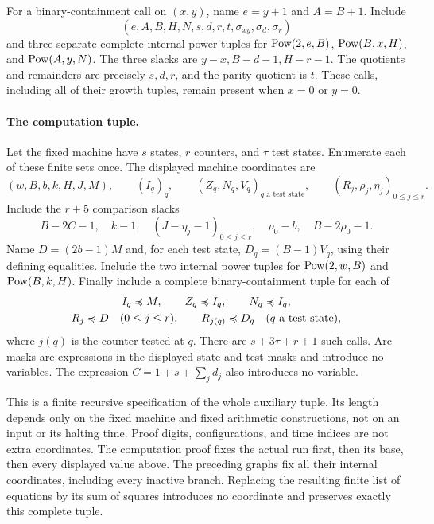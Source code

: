 For a binary-containment call on \((x,y)\), name \(e=y+1\) and
\(A=B+1\). Include
\[
 (e,A,B,H,N,s,d,r,t,\sigma_{xy},\sigma_d,\sigma_r)
\]
and three separate complete internal power tuples for
\(\operatorname{Pow}(2,e,B)\), \(\operatorname{Pow}(B,x,H)\), and \(\operatorname{Pow}(A,y,N)\).
The three slacks are \(y-x,B-d-1,H-r-1\). The quotients and remainders
are precisely \(s,d,r\), and the parity quotient is \(t\).
These calls, including all of their growth tuples, remain present when
\(x=0\) or \(y=0\).

\paragraph{The computation tuple.}
Let the fixed machine have \(s\) states, \(r\) counters, and
\(\tau\) test states. Enumerate each of these finite sets once.
The displayed machine coordinates are
\[
 (w,B,b,k,H,J,M),\qquad
 (I_q)_q,\qquad (Z_q,N_q,V_q)_{q\text{ a test state}},
 \qquad (R_j,\rho_j,\eta_j)_{0\le j\le r}.
\]
Include the \(r+5\) comparison slacks
\[
 B-2C-1,\quad k-1,\quad (J-\eta_j-1)_{0\le j\le r},
 \quad \rho_0-b,\quad B-2\rho_0-1.
\]
Name \(D=(2b-1)M\) and, for each test state, \(D_q=(B-1)V_q\),
using their defining equalities. Include the two internal power tuples
for \(\operatorname{Pow}(2,w,B)\) and \(\operatorname{Pow}(B,k,H)\). Finally include a complete
binary-containment tuple for each of
\[
 \begin{gathered}
  I_q\preccurlyeq M,\qquad Z_q\preccurlyeq I_q,\qquad N_q\preccurlyeq I_q,\\
  R_j\preccurlyeq D\quad(0\le j\le r),\qquad
  R_{j(q)}\preccurlyeq D_q\quad(q\text{ a test state}),
 \end{gathered}
\]
where \(j(q)\) is the counter tested at \(q\). There are
\(s+3\tau+r+1\) such calls. Arc masks are expressions in the displayed
state and test masks and introduce no variables. The expression
\(C=1+s+\sum_jd_j\) also introduces no variable.

This is a finite recursive specification of the whole auxiliary tuple.
Its length depends only on the fixed machine and fixed arithmetic
constructions, not on an input or its halting time. Proof digits,
configurations, and time indices are not extra coordinates.
The computation proof fixes the actual run first, then its base,
then every displayed value above. The preceding graphs fix all their
internal coordinates, including every inactive branch. Replacing the
resulting finite list of equations by its sum of squares introduces no
coordinate and preserves exactly this complete tuple.
